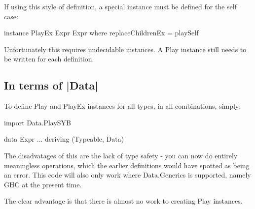 \documentclass[preprint]{sigplanconf}
\begin{document}
If using this style of definition, a special instance must be defined for the self case:

instance PlayEx Expr Expr where
    replaceChildrenEx = playSelf

Unfortunately this requires undecidable instances. A Play instance still needs to be written for each definition.


\subsection{In terms of |Data|}

 To define Play and PlayEx instances for all types, in all combinations, simply:

import Data.PlaySYB

data Expr ... deriving (Typeable, Data)

The disadvatages of this are the lack of type safety - you can now do entirely meaningless operations, which the earlier definitions would have spotted as being an error. This code will also only work where Data.Generics is supported, namely GHC at the present time.

The clear advantage is that there is almost no work to creating Play instances.
\end{document}
